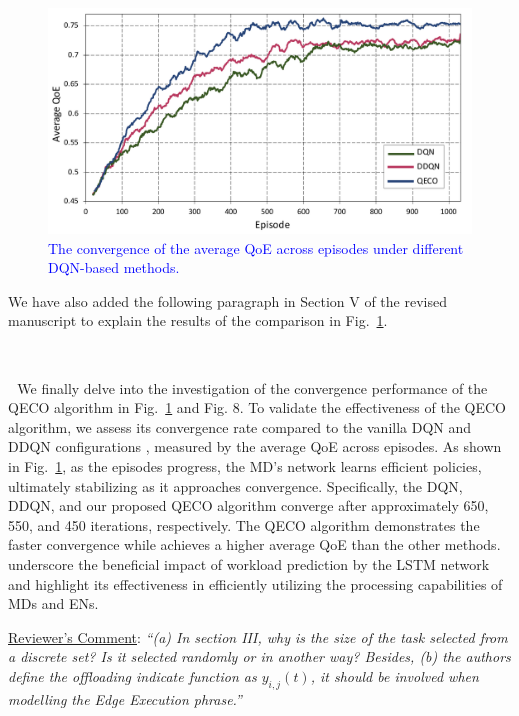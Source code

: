 \documentclass[12pt,draftclsnofoot,onecolumn]{IEEEtran}
\newcommand{\rev}[1]{{\color{blue}#1}} %
\newcommand{\rev}[1]{#1}
\newenvironment{my}[2]%
{\begin{list}{}%
{\setlength{\rightmargin}{#1}\setlength{\leftmargin}{#2}}%


 \item[]{}

} {\end{list}}
\begin{document}
\begin{enumerate}
\setcounter{figure}{6}

\begin{figure}[H]
	\captionsetup{name=Fig.}
	\centering
	\includegraphics[width=.6\linewidth]{m1}
	\vspace*{-3mm}
	\caption{\textcolor{blue}{The convergence of the average QoE across episodes under different DQN-based methods.}}
	\vspace*{-3mm}
	\label{chart000}
\end{figure}

We have also added the following paragraph in Section V of the revised manuscript to explain the results of the comparison in Fig.~\ref{chart000}.
		\begin{my}{1cm}{1cm}
	\rev{
		{\

	\,\,\,\,We finally delve into the investigation of the convergence performance of the QECO algorithm in Fig.~\ref{chart000} and Fig. 8. To validate the effectiveness of the QECO algorithm, we assess its convergence rate compared to the vanilla DQN and DDQN configurations \cite{van2016deep}, measured by the average QoE across episodes. As shown in Fig.~\ref{chart000}, as the episodes progress, the MD's network learns efficient policies, ultimately stabilizing as it approaches convergence. Specifically, the DQN, DDQN, and our proposed QECO algorithm converge after approximately 650, 550, and 450 iterations, respectively. The QECO algorithm demonstrates the faster convergence while achieves a higher average QoE than the other methods. underscore the beneficial impact of workload prediction by the LSTM network and highlight its effectiveness in efficiently utilizing the processing capabilities of  MDs and ENs.
}}
\end{my}


\vspace{6mm}

\item \underline{Reviewer's Comment}: 
\textit{``(a) In section III, why is the size of the task selected from a discrete set? Is it selected randomly or in another way? Besides, (b) the authors define the offloading indicate function as $y_{i,j}(t)$, it should be involved when modelling the Edge Execution phrase.''} \newline


\end{enumerate}
\end{document}
